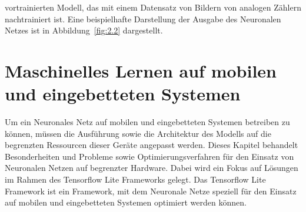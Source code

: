 vortrainierten Modell, das mit einem Datensatz von Bildern von analogen Zählern nachtrainiert ist. Eine beispielhafte Darstellung der Ausgabe des Neuronalen Netzes ist in Abbildung~\ref{fig:2.2} dargestellt.
    
\section{Maschinelles Lernen auf mobilen und eingebetteten Systemen}\label{sec:Machine Learning auf mobilen und eingebetteten Systemen}
    Um ein Neuronales Netz auf mobilen und eingebetteten Systemen betreiben zu können, müssen die Ausführung sowie die Architektur des Modells auf die begrenzten Ressourcen dieser Geräte angepasst werden. Dieses Kapitel behandelt Besonderheiten und Probleme sowie Optimierungsverfahren für den Einsatz von Neuronalen Netzen auf begrenzter Hardware. Dabei wird ein Fokus auf Lösungen im Rahmen des Tensorflow Lite Frameworks gelegt. Das Tensorflow Lite Framework ist ein Framework, mit dem Neuronale Netze speziell für den Einsatz auf mobilen und eingebetteten Systemen optimiert werden können.
